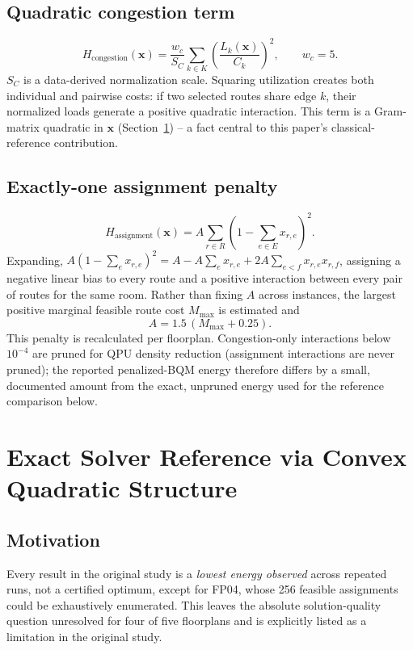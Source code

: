 \documentclass[11pt]{article}
\begin{document}
\subsection{Quadratic congestion term}
\begin{equation}
H_{\text{congestion}}(\mathbf{x}) = \frac{w_c}{S_C}\sum_{k \in K}\left(\frac{L_k(\mathbf{x})}{C_k}\right)^2, \qquad w_c = 5. \tag{5}
\end{equation}
$S_C$ is a data-derived normalization scale. Squaring utilization creates both individual and pairwise costs: if two selected routes share edge $k$, their normalized loads generate a positive quadratic interaction. This term is a Gram-matrix quadratic in $\mathbf{x}$ (Section~\ref{sec:milp}) -- a fact central to this paper's classical-reference contribution.

\subsection{Exactly-one assignment penalty}
\begin{equation}
H_{\text{assignment}}(\mathbf{x}) = A \sum_{r \in R}\left(1 - \sum_{e \in E} x_{r,e}\right)^2. \tag{6}
\end{equation}
Expanding, $A(1-\sum_e x_{r,e})^2 = A - A\sum_e x_{r,e} + 2A\sum_{e<f} x_{r,e}x_{r,f}$, assigning a negative linear bias to every route and a positive interaction between every pair of routes for the same room. Rather than fixing $A$ across instances, the largest positive marginal feasible route cost $M_{\max}$ is estimated and
\begin{equation}
A = 1.5\,(M_{\max} + 0.25). \tag{7}
\end{equation}
This penalty is recalculated per floorplan. Congestion-only interactions below $10^{-4}$ are pruned for QPU density reduction (assignment interactions are never pruned); the reported penalized-BQM energy therefore differs by a small, documented amount from the exact, unpruned energy used for the reference comparison below.

\section{Exact Solver Reference via Convex Quadratic Structure}
\label{sec:milp}

\subsection{Motivation}
Every result in the original study is a \emph{lowest energy observed} across repeated runs, not a certified optimum, except for FP04, whose 256 feasible assignments could be exhaustively enumerated. This leaves the absolute solution-quality question unresolved for four of five floorplans and is explicitly listed as a limitation in the original study.
\end{document}
